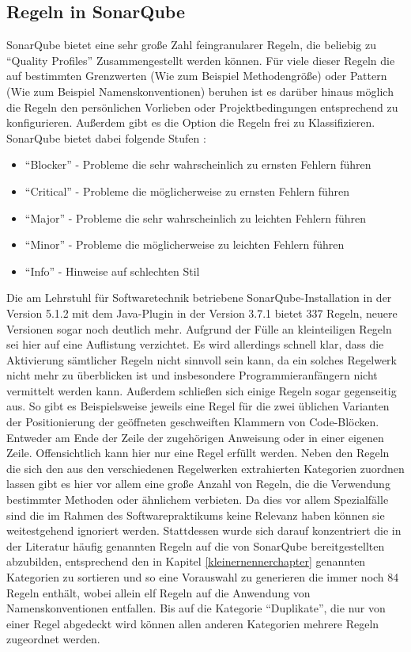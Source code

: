 \documentclass[da,ngerman]{stthesis}
\begin{document}
			\subsection{Regeln in SonarQube}
			SonarQube bietet eine sehr große Zahl feingranularer Regeln, die beliebig zu "`Quality Profiles"' Zusammengestellt werden können. Für viele dieser Regeln die auf bestimmten Grenzwerten (Wie zum Beispiel Methodengröße) oder Pattern (Wie zum Beispiel Namenskonventionen) beruhen ist es darüber hinaus möglich die Regeln den persönlichen Vorlieben oder Projektbedingungen entsprechend zu konfigurieren. Außerdem gibt es die Option die Regeln frei zu Klassifizieren. \newline
			SonarQube bietet dabei folgende Stufen \cite{SonarRuleSeverities}: 
			\begin{itemize}
				\item "`Blocker"' - Probleme die sehr wahrscheinlich zu ernsten Fehlern führen
				\item "`Critical"' - Probleme die möglicherweise zu ernsten Fehlern führen
				\item "`Major"' - Probleme die sehr wahrscheinlich zu leichten Fehlern führen 
				\item "`Minor"' - Probleme die möglicherweise zu leichten Fehlern führen 
				\item "`Info"' - Hinweise auf schlechten Stil
			\end{itemize}
			Die am Lehrstuhl für Softwaretechnik betriebene SonarQube-Installation in der Version 5.1.2 mit dem Java-Plugin in der Version 3.7.1 bietet 337 Regeln, neuere Versionen sogar noch deutlich mehr. Aufgrund der Fülle an kleinteiligen Regeln sei hier auf eine Auflistung verzichtet. Es wird allerdings schnell klar, dass die Aktivierung sämtlicher Regeln nicht sinnvoll sein kann, da ein solches Regelwerk nicht mehr zu überblicken ist und insbesondere Programmieranfängern nicht vermittelt werden kann. Außerdem schließen sich einige Regeln sogar gegenseitig aus. So gibt es Beispielsweise jeweils eine Regel für die zwei üblichen Varianten der Positionierung der geöffneten geschweiften Klammern von Code-Blöcken. Entweder am Ende der Zeile der zugehörigen Anweisung oder in einer eigenen Zeile. Offensichtlich kann hier nur eine Regel erfüllt werden. Neben den Regeln die sich den aus den verschiedenen Regelwerken extrahierten Kategorien zuordnen lassen gibt es hier vor allem eine große Anzahl von Regeln, die die Verwendung bestimmter Methoden oder ähnlichem verbieten. Da dies vor allem Spezialfälle sind die im Rahmen des Softwarepraktikums keine Relevanz haben können sie weitestgehend ignoriert werden. Stattdessen wurde sich darauf konzentriert die in der Literatur häufig genannten Regeln auf die von SonarQube bereitgestellten abzubilden, entsprechend den in Kapitel \ref{kleinernennerchapter} genannten Kategorien zu sortieren und so eine Vorauswahl zu generieren die immer noch 84 Regeln enthält, wobei allein elf Regeln auf die Anwendung von Namenskonventionen entfallen. Bis auf die Kategorie "`Duplikate"', die nur von einer Regel abgedeckt wird können allen anderen Kategorien mehrere Regeln zugeordnet werden. \newline
\end{document}
